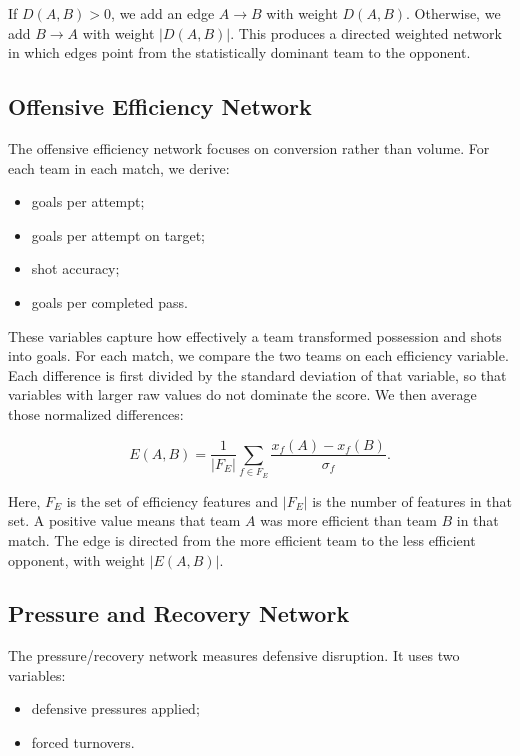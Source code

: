 \documentclass[10pt,twocolumn]{article}
\begin{document}
If $D(A,B) > 0$, we add an edge $A \rightarrow B$ with weight $D(A,B)$. Otherwise, we add $B \rightarrow A$ with weight $|D(A,B)|$. This produces a directed weighted network in which edges point from the statistically dominant team to the opponent.

\subsection{Offensive Efficiency Network}

The offensive efficiency network focuses on conversion rather than volume. For each team in each match, we derive:

\begin{itemize}
    \item goals per attempt;
    \item goals per attempt on target;
    \item shot accuracy;
    \item goals per completed pass.
\end{itemize}

These variables capture how effectively a team transformed possession and shots into goals. For each match, we compare the two teams on each efficiency variable. Each difference is first divided by the standard deviation of that variable, so that variables with larger raw values do not dominate the score. We then average those normalized differences:

\[
    E(A,B) = \frac{1}{|F_E|}\sum_{f \in F_E}
    \frac{x_f(A)-x_f(B)}{\sigma_f}.
\]

Here, $F_E$ is the set of efficiency features and $|F_E|$ is the number of features in that set. A positive value means that team $A$ was more efficient than team $B$ in that match. The edge is directed from the more efficient team to the less efficient opponent, with weight $|E(A,B)|$.

\subsection{Pressure and Recovery Network}

The pressure/recovery network measures defensive disruption. It uses two variables:

\begin{itemize}
    \item defensive pressures applied;
    \item forced turnovers.
\end{itemize}
\end{document}
